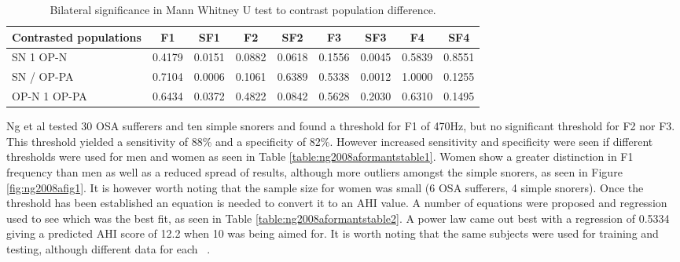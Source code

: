 \begin{table}[h]
\centering
\begin{tabular}{l c c c c c c c c}
\toprule
Contrasted populations&F1&SF1&F2&SF2&F3&SF3&F4&SF4\\ \midrule
SN 1 OP-N&0.4179&0.0151&0.0882&0.0618&0.1556&0.0045&0.5839&0.8551\\ 
SN / OP-PA&0.7104&0.0006&0.1061&0.6389&0.5338&0.0012&1.0000&0.1255\\ 
OP-N 1 OP-PA&0.6434&0.0372&0.4822&0.0842&0.5628&0.2030&0.6310&0.1495\\ \bottomrule
\end{tabular}
\caption{Bilateral significance in Mann Whitney U test to contrast population difference.}
\label{table:sola2003formants}
\end{table}
Ng et al tested 30 OSA sufferers and ten simple snorers and found a threshold for F1 of 470Hz, but no significant threshold for F2 nor F3. This threshold yielded a sensitivity of 88\% and a specificity of 82\%. However increased sensitivity and specificity were seen if different thresholds were used for men and women as seen in Table \ref{table:ng2008aformantstable1}. Women show a greater distinction in F1 frequency than men as well as a reduced spread of results, although more outliers amongst the simple snorers, as seen in Figure \ref{fig:ng2008afig1}. It is however worth noting that the sample size for women was small (6 OSA sufferers, 4 simple snorers). Once the threshold has been established an equation is needed to convert it to an AHI value. A number of equations were proposed and regression used to see which was the best fit, as seen in Table \ref{table:ng2008aformantstable2}. A power law came out best with a regression of 0.5334 giving a predicted AHI score of 12.2 when 10 was being aimed for. It is worth noting that the same subjects were used for training and testing, although different data for each ~\cite{ng2008could}.

